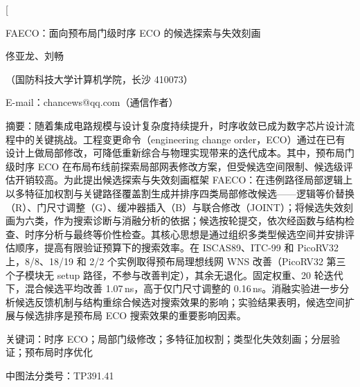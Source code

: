 \documentclass[twocolumn,10pt,fontset=windows]{ctexart}
\let\songti\songfamily\let\heiti\heifamily\let\fangsong\fangfamily
\begin{document}
\pagestyle{plain}

\twocolumn[
\vspace*{-0.25cm}
\begin{center}
{\heiti{} FAECO：面向预布局门级时序 ECO 的候选探索与失效刻画}\par
\vspace{6pt}
{\fangsong{} 佟亚龙、刘畅}\par
\vspace{4pt}
{\songti\fontsize{8}{12}\selectfont（国防科技大学计算机学院，长沙 410073）}\par\vspace{2pt}
{\songti\fontsize{8}{12}\selectfont E-mail：chancews@qq.com（通信作者）}\par
\vspace{6pt}
\end{center}
\begin{flushleft}
  {\heiti\fontsize{8.5}{13}\selectfont 摘\quad 要：}{\songti\fontsize{8.5}{13}\selectfont 随着集成电路规模与设计复杂度持续提升，时序收敛已成为数字芯片设计流程中的关键挑战。工程变更命令（engineering change order，ECO）通过在已有设计上做局部修改，可降低重新综合与物理实现带来的迭代成本。其中，预布局门级时序 ECO 在布局布线前探索局部网表修改方案，但受候选空间限制、候选级评估开销较高。为此提出候选探索与失效刻画框架 FAECO：在违例路径局部逻辑上以多特征加权割与关键路径覆盖割生成并排序四类局部修改候选——逻辑等价替换（R）、门尺寸调整（G）、缓冲器插入（B）与联合修改（JOINT）；将候选失效刻画为六类，作为搜索诊断与消融分析的依据；候选按轮提交，依次经函数与结构检查、时序分析与最终等价性检查。其核心思想是通过组织多类型候选空间并安排评估顺序，提高有限验证预算下的搜索效率。在 ISCAS89、ITC-99 和 PicoRV32 上，8/8、18/19 和 2/2 个实例取得预布局理想线网 WNS 改善（PicoRV32 第三个子模块无 setup 路径，不参与改善判定），其余无退化。固定权重、20 轮迭代下，混合候选平均改善 1.07\,ns，高于仅门尺寸调整的 0.16\,ns。消融实验进一步分析候选反馈机制与结构重综合候选对搜索效果的影响；实验结果表明，候选空间扩展与候选排序是预布局 ECO 搜索效果的重要影响因素。}
\par
\vspace{4pt}
{\heiti\fontsize{8.5}{13}\selectfont 关键词：}{\songti\fontsize{8.5}{13}\selectfont 时序 ECO；局部门级修改；多特征加权割；类型化失效刻画；分层验证；预布局时序优化}\par
\vspace{2pt}
{\songti\fontsize{8.5}{13}\selectfont 中图法分类号：TP391.41}\par
\vspace{3pt}
\end{flushleft}
\end{document}
